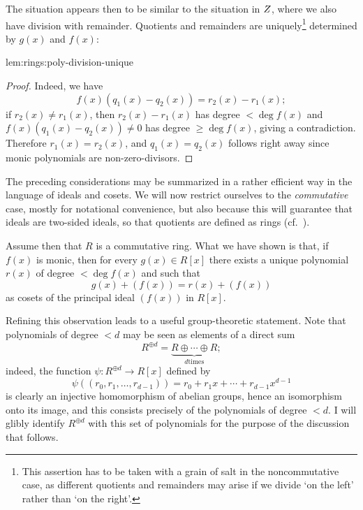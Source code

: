 The situation appears then to be similar to the situation in $Z$,
where we also have division with remainder. Quotients and remainders
are uniquely\footnote{This assertion has to be taken with a grain of
  salt in the noncommutative case, as different quotients and
  remainders may arise if we divide `on the left' rather than `on the
  right'.} determined by $g(x)$ and $f(x)$:

\begin{lem}{}{lem:rings:poly-division-unique}
\end{lem}
\begin{proof}
  Indeed, we have
  \[
    f(x)(q_1(x) - q_2(x)) = r_2(x) - r_1(x);
  \]
  if $r_2(x) \neq r_1(x)$, then $r_2(x) - r_1(x)$ has degree
  $< \deg f(x)$ and $f(x)(q_1(x) - q_2(x)) \neq 0$ has degree
  $\geq \deg f(x)$, giving a contradiction. Therefore
  $r_1(x) = r_2(x)$, and $q_1(x) = q_2(x)$ follows right away since
  monic polynomials are non-zero-divisors.
\end{proof}

The preceding considerations may be summarized in a rather efficient
way in the language of ideals and cosets. We will now restrict
ourselves to the \emph{commutative} case, mostly for notational
convenience, but also because this will guarantee that ideals are
two-sided ideals, so that quotients are defined as rings (cf.\
).

Assume then that $R$ is a commutative ring. What we have shown is
that, if $f(x)$ is monic, then for every $g(x) \in R[x]$ there exists
a unique polynomial $r(x)$ of degree $< \deg f(x)$ and such that
\[
  g(x) + (f(x)) = r(x) + (f(x))
\]
as cosets of the principal ideal $(f(x))$ in $R[x]$.

Refining this observation leads to a useful group-theoretic
statement. Note that polynomials of degree $< d$ may be seen as
elements of a direct sum
\[
  R^{\oplus d} = \underbrace{R \oplus \cdots \oplus R}_{d \text{
      times}};
\]
indeed, the function $\psi : R^{\oplus d} \to R[x]$ defined by
\[
  \psi((r_0, r_1, \ldots, r_{d-1})) = r_0 + r_1 x + \cdots + r_{d-1}
  x^{d-1}
\]
is clearly an injective homomorphism of abelian groups, hence an
isomorphism onto its image, and this consists precisely of the
polynomials of degree $< d$. I will glibly identify $R^{\oplus d}$
with this set of polynomials for the purpose of the discussion that
follows.

